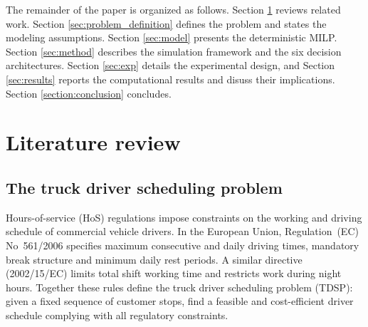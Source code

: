 \documentclass[preprint,12pt,3p]{elsarticle}
\begin{document}
The remainder of the paper is organized as follows. Section \ref{sec:litreview} reviews related work. Section \ref{sec:problem_definition} defines the problem and states the modeling assumptions. Section \ref{sec:model} presents the deterministic MILP. Section \ref{sec:method} describes the simulation framework and the {six} decision architectures. Section \ref{sec:exp} details the experimental design, and Section \ref{sec:results} reports the computational results and disuss their implications. Section \ref{section:conclusion} concludes.





\section{Literature review} \label{sec:litreview}
\subsection{The truck driver scheduling problem}
Hours-of-service (HoS) regulations impose constraints on the working and driving schedule of commercial vehicle drivers. In the European Union, Regulation~(EC) No~561/2006 \citep{noauthor_regulation_2006} specifies maximum consecutive and daily driving times, mandatory break structure and minimum daily rest periods. A similar directive (2002/15/EC) limits total shift working time and restricts work during night hours. Together these rules define the truck driver scheduling problem (TDSP): given a fixed sequence of customer stops, find a feasible and cost-efficient driver schedule complying with all regulatory constraints.
\end{document}
